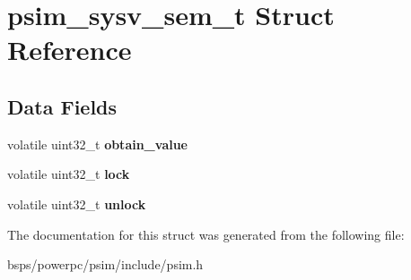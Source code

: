 \hypertarget{structpsim__sysv__sem__t}{}\section{psim\+\_\+sysv\+\_\+sem\+\_\+t Struct Reference}
\label{structpsim__sysv__sem__t}
\subsection*{Data Fields}
\begin{DoxyCompactItemize}
\item 
\mbox{\label{structpsim__sysv__sem__t_aec13b4d9b600cb016135b447e5fe2ed3}} 
volatile uint32\+\_\+t {\bfseries obtain\+\_\+value}
\item 
\mbox{\label{structpsim__sysv__sem__t_a6f6497c2634c2729e361264643a0c326}} 
volatile uint32\+\_\+t {\bfseries lock}
\item 
\mbox{\label{structpsim__sysv__sem__t_a69ce27c98b613dd62b502328d077266a}} 
volatile uint32\+\_\+t {\bfseries unlock}
\end{DoxyCompactItemize}


The documentation for this struct was generated from the following file\+:\begin{DoxyCompactItemize}
\item 
bsps/powerpc/psim/include/psim.\+h\end{DoxyCompactItemize}
